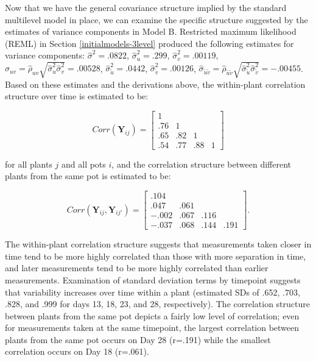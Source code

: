 \documentclass[
]{krantz}
\begin{document}
Now that we have the general covariance structure implied by the standard multilevel model in place, we can examine the specific structure suggested by the estimates of variance components in Model B. Restricted maximum likelihood (REML) in Section \ref{initialmodels-3level} produced the following estimates for variance components: \(\hat{\sigma}^2=.0822\), \(\hat{\sigma}_{u}^{2}=.299\), \(\hat{\sigma}_{v}^{2}=.00119\), \(\hat{\sigma}_{uv}=\hat{\rho}_{uv}\sqrt{\hat{\sigma}_{u}^{2}\hat{\sigma}_{v}^{2}}=.00528\), \(\hat{\sigma}_{\tilde{u}}^{2}=.0442\), \(\hat{\sigma}_{\tilde{v}}^{2}=.00126\), \(\hat{\sigma}_{\tilde{u}\tilde{v}}=\hat{\rho}_{\tilde{u}\tilde{v}}\sqrt{\hat{\sigma}_{\tilde{u}}^{2}\hat{\sigma}_{\tilde{v}}^{2}}=-.00455\). Based on these estimates and the derivations above, the within-plant correlation structure over time is estimated to be:

\[  Corr(\textbf{Y}_{ij}) = \left[
          \begin{array}{cccc}
            1 & & & \\
            .76 & 1 & & \\
            .65 & .82 & 1 & \\
            .54 & .77 & .88 & 1
          \end{array} \right] \]

for all plants \(j\) and all pots \(i\), and the correlation structure between different plants from the same pot is estimated to be:

\[  Corr(\textbf{Y}_{ij},\textbf{Y}_{ij'}) = \left[
          \begin{array}{cccc}
            .104 & & & \\
            .047 & .061 & & \\
            -.002 & .067 & .116 & \\
            -.037 & .068 & .144 & .191
          \end{array} \right]. \]

The within-plant correlation structure suggests that measurements taken closer in time tend to be more highly correlated than those with more separation in time, and later measurements tend to be more highly correlated than earlier measurements. Examination of standard deviation terms by timepoint suggests that variability increases over time within a plant (estimated SDs of .652, .703, .828, and .999 for days 13, 18, 23, and 28, respectively). The correlation structure between plants from the same pot depicts a fairly low level of correlation; even for measurements taken at the same timepoint, the largest correlation between plants from the same pot occurs on Day 28 (r=.191) while the smallest correlation occurs on Day 18 (r=.061).
\end{document}
